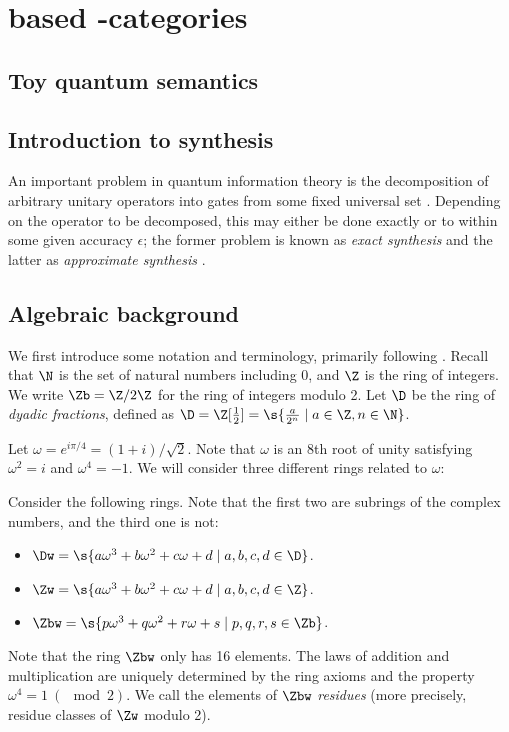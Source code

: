 \chapter{ based \protect{$\dagger$}-categories} %
\label{cha:d_omega_based_dagger_categories}
\section{Toy quantum semantics} %
\label{sec:toy_quantum_semantics}

\section{Introduction to synthesis} %
\label{sec:introduction_to_synthesis}
An important problem in quantum information theory is the decomposition of arbitrary unitary
operators into gates from some fixed universal set {\cite{neilsen2000:QuantumComputationAndInfo}}.
Depending on the operator to be decomposed, this may either be done exactly or to within some given
accuracy $\epsilon$; the former problem is known as {\em exact synthesis} and the latter as {\em
approximate synthesis} {\cite{Kliuchnikov-et-al}}.

\section{Algebraic background} %
\label{sec:algebraic_background}

We first introduce some notation and terminology, primarily following {\cite{Kliuchnikov-et-al}}.
Recall that $\N$ is the set of natural numbers including 0, and $\Z$ is the ring of
integers. We write $\Zb=\Z/2\Z$ for the ring of integers modulo 2. Let $\D$ be the ring
of {\em dyadic fractions}, defined as $\D = \Z[\frac12] = \s{\frac{a}{2^n}\mid a\in\Z, n\in\N}$.

Let $\omega = e^{i\pi/4} = (1+i)/\sqrt{2}$. Note that $\omega$ is an 8th root of unity satisfying
$\omega^2=i$ and $\omega^4=-1$. We will consider three different rings related to $\omega$:

\begin{definition}
  Consider the following rings. Note that the first two are subrings of the complex numbers, and
  the third one is not:
  \begin{itemize}
    \item $\Dw = \s{a\omega^3+b\omega^2+c\omega+d \mid a,b,c,d\in\D}$.
    \item $\Zw = \s{a\omega^3+b\omega^2+c\omega+d \mid a,b,c,d\in\Z}$.
    \item $\Zbw = \s{p\omega^3+q\omega^2+r\omega+s \mid p,q,r,s\in\Zb}$.
  \end{itemize}
  Note that the ring $\Zbw$ only has 16 elements. The laws of addition and multiplication are
  uniquely determined by the ring axioms and the property $\omega^4=1\ (\mod 2)$. We call the
  elements of $\Zbw$ {\em residues} (more precisely, residue classes of $\Zw$ modulo 2).
\end{definition}

